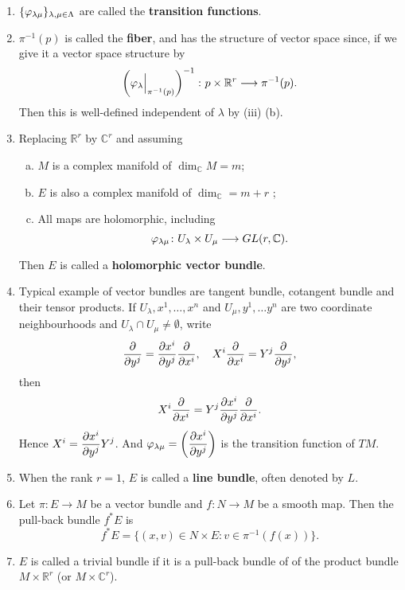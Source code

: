 \documentclass[12pt]{article}
\begin{document}
\begin{remark}\hfill
\begin{enumerate}[1.]
\item \(\{\varphi_{\lambda\mu}\}_{\lambda,\mu\in \Lambda}\) are called the
    \textbf{transition functions}.
\item \(\pi^{-1}(p)\) is called the \textbf{fiber}, and has the structure of
    vector space since, if we give it a vector space structure by \[
        \left(\varphi_\lambda\Big|_{\pi^{-1}(p)}\right)^{-1}\colon p\times
        \mathbb{R}^r\longrightarrow \pi^{-1}(p)
    .\] Then  this is well-defined independent of \(\lambda\) by (iii) (b).
\item Replacing \(\mathbb{R}^r\) by \(\mathbb{C}^r\) and assuming
    \begin{enumerate}[(a)]
    \item \(M\) is a complex manifold of \(\dim_{\mathbb{C}}M=m\);
    \item \(E\) is also a complex manifold of \(\dim_{\mathbb{C}}=m+r\) ;
    \item All maps are holomorphic, including \[
        \varphi_{\lambda\mu}\colon U_\lambda\times U_\mu\longrightarrow
        GL(r,\mathbb{C})
    .\] 
    \end{enumerate}
    Then \(E\) is called a \textbf{holomorphic vector bundle}.
\item Typical example of vector bundles are tangent bundle, cotangent bundle
    and their tensor products. If \(U_\lambda,x^1,\ldots,x^n\) and \(U_\mu,y^1,\ldots
    y^n\) are two coordinate neighbourhoods and \(U_\lambda\cap U_\mu\neq \emptyset\),
    write \[
        \pdv{}{y^j}=\pdv{x^i}{y^j}\pdv{}{x^i},\quad
        X^i\pdv{}{x^i}=Y^j\pdv{}{y^j}
    ,\] then \[
        X^i\pdv{}{x^i}=Y^j\pdv{x^i}{y^j}\pdv{}{x^i}
    .\] Hence \(X^i=\displaystyle\pdv{x^i}{y^j}Y^j\). And \(\varphi_{\lambda\mu}=\left(
    \displaystyle\pdv{x^i}{y^j}\right)\) is the transition function of \(TM\).
\item When the rank \(r=1\), \(E\) is called a \textbf{line bundle},
    often denoted by \(L\).
\item Let \(\pi\colon E\to M\) be a vector bundle and \(f\colon N\to M\) be a smooth 
    map. Then the pull-back bundle \(f^*E\) is \[
        f^*E=\{(x,v)\in N\times E:v\in \pi^{-1}(f(x))\}
    .\] 
\item \(E\) is called a trivial bundle if it is a pull-back bundle of of the product
    bundle \(M\times \mathbb{R}^r\) (or \(M\times \mathbb{C}^r\)).
\end{enumerate}
\end{remark}
\end{document}
